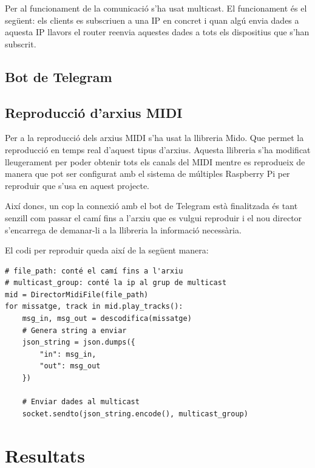 \documentclass[a4paper]{paper}
\let\oldsection\section
\renewcommand\section{\clearpage\oldsection}
\begin{document}
Per al funcionament de la comunicació s'ha usat multicast. El funcionament és el següent: els clients es subscriuen a una IP en concret i quan algú envia dades a aquesta IP llavors el router reenvia aquestes dades a tots els dispositius que s'han subscrit.



\subsection{Bot de Telegram}


\subsection{Reproducció d'arxius MIDI}
Per a la reproducció dels arxius MIDI s'ha usat la llibreria Mido\cite{mido}. Que permet la reproducció en temps real d'aquest tipus d'arxius. Aquesta llibreria s'ha modificat lleugerament per poder obtenir tots els canals del MIDI mentre es reprodueix de manera que pot ser configurat amb el sistema de múltiples Raspberry Pi per reproduir que s'usa en aquest projecte.

Així doncs, un cop la connexió amb el bot de Telegram està finalitzada és tant senzill com passar el camí fins a l'arxiu que es vulgui reproduir i el nou director s'encarrega de demanar-li a la llibreria la informació necessària.

El codi per reproduir queda així de la següent manera:
\begin{lstlisting}[style=mypython]
# file_path: conté el camí fins a l'arxiu
# multicast_group: conté la ip al grup de multicast
mid = DirectorMidiFile(file_path)
for missatge, track in mid.play_tracks():
	msg_in, msg_out = descodifica(missatge)
	# Genera string a enviar
	json_string = json.dumps({
		"in": msg_in,
		"out": msg_out
	})
	
	# Enviar dades al multicast
	socket.sendto(json_string.encode(), multicast_group)
\end{lstlisting}


\section{Resultats}



\printbibliography
\end{document}
